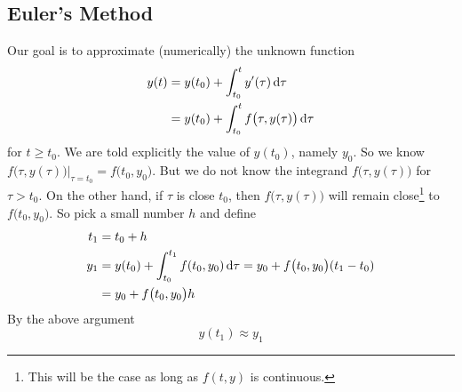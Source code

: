 \subsection{Euler's Method}\label{ap_euler}
Our goal is to approximate (numerically) the unknown function 
\begin{align*}
y(t) &= y(t_0) + \int_{t_0}^t y'(\tau)\,\mathrm{d}\tau \\
     &= y(t_0) + \int_{t_0}^t f\big(\tau,y(\tau)\big)\,\mathrm{d}\tau
\end{align*} 
for $t\ge t_0$.  We are told explicitly the value of $y(t_0)$, namely $y_0$.
So we know $f\big(\tau,y(\tau)\big)\big|_{\tau=t_0}=f\big(t_0,y_0\big)$.
But we do not know the integrand $f\big(\tau,y(\tau)\big)$ for $\tau>t_0$.
On the other hand, if $\tau$ is close $t_0$, then $f\big(\tau,y(\tau)\big)$ will remain close\footnote{This will be the case as long as $f(t,y)$ is continuous.} 
to $f\big(t_0,y_0\big)$. So pick a small number $h$ and define 
\begin{align*}
t_1&=t_0+h \\
y_1&=y(t_0) + \int_{t_0}^{t_1} f(t_0,y_0)\,\mathrm{d}\tau
   =y_0+f\big(t_0,y_0\big)(t_1-t_0) \\
  &=y_0+f\big(t_0,y_0\big)h
\end{align*} 
By the above argument 
\begin{equation*}
y(t_1)\approx y_1 
\end{equation*}



